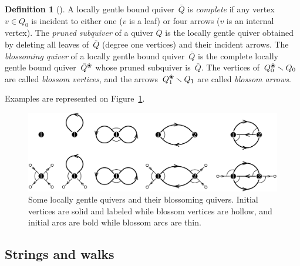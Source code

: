 \documentclass{amsart}
\theoremstyle{definition}
\newtheorem{definition}[theorem]{Definition}
\newcommand{\ssm}{\smallsetminus} %
\newcommand{\fref}[1]{Figure~\ref{#1}} %
\newcommand{\darkblue}{\color{darkblue}} %
\newcommand{\defn}[1]{\textsl{\darkblue #1}} %
\newcommand{\blossom}{^\text{\ding{96}}} %
\begin{document}
\begin{definition}[\cite{PaluPilaudPlamondon}]
\label{def:blossomingQuiver}
A locally gentle bound quiver~$\bar Q$ is \defn{complete} if any vertex~$v \in Q_0$ is incident to either one ($v$ is a leaf) or four arrows ($v$ is an internal vertex).
The \defn{pruned subquiver} of a quiver $\bar Q$ is the locally gentle quiver obtained by deleting all leaves of~$\bar Q$ (degree one vertices) and their incident arrows.
The \defn{blossoming quiver} of a locally gentle bound quiver~$\bar Q$ is the complete locally gentle bound quiver~$\bar Q\blossom$ whose pruned subquiver is~$\bar Q$.
The vertices of~$Q\blossom_0 \ssm Q_0$ are called \defn{blossom vertices}, and the arrows~$Q\blossom_1 \ssm Q_1$ are called \defn{blossom arrows}.
\end{definition}

Examples are represented on \fref{fig:quivers}.

\begin{figure}[t]
	\capstart
	\centerline{\includegraphics[scale=.6]{quivers}}
	\caption{Some locally gentle quivers and their blossoming quivers. Initial vertices are solid and labeled while blossom vertices are hollow, and initial arcs are bold while blossom arcs are thin.}
	\label{fig:quivers}
\end{figure}



\subsection{Strings and walks}
\end{document}

